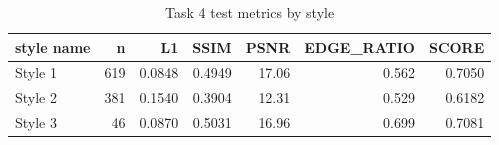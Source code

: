 \begin{table}[t]
\centering
\caption{Task 4 test metrics by style}
\label{tab:task4-by_style}
\begin{tabular}{lrrrrrr}
\toprule
style name & n & L1 & SSIM & PSNR & EDGE_RATIO & SCORE \\
\midrule
Style 1 & 619 & 0.0848 & 0.4949 & 17.06 & 0.562 & 0.7050 \\
Style 2 & 381 & 0.1540 & 0.3904 & 12.31 & 0.529 & 0.6182 \\
Style 3 & 46 & 0.0870 & 0.5031 & 16.96 & 0.699 & 0.7081 \\
\bottomrule
\end{tabular}
\end{table}
